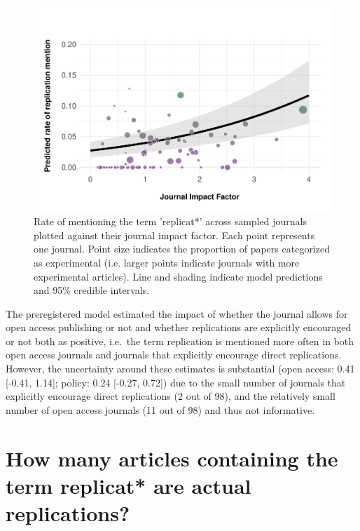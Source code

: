 \documentclass[]{elsarticle} %
\begin{document}
\begin{figure}

{\centering \includegraphics[width=1\linewidth]{ReplicationLing_files/figure-latex/plot-mention-jif-1} 

}

\caption{Rate of mentioning the term 'replicat*' across sampled journals plotted against their journal impact factor. Each point represents one journal. Point size indicates the proportion of papers categorized as experimental (i.e. larger points indicate journals with more experimental articles). Line and shading indicate model predictions and 95\% credible intervals.}\label{fig:plot-mention-jif}
\end{figure}

The preregistered model estimated the impact of whether the journal allows for open access publishing or not and whether replications are explicitly encouraged or not both as positive, i.e.~the term replication is mentioned more often in both open access journals and journals that explicitly encourage direct replications. However, the uncertainty around these estimates is substantial (open access: 0.41 {[}-0.41, 1.14{]}; policy: 0.24 {[}-0.27, 0.72{]}) due to the small number of journals that explicitly encourage direct replications (2 out of 98), and the relatively small number of open access journals (11 out of 98) and thus not informative.

\hypertarget{how-many-articles-containing-the-term-replicat-are-actual-replications}{%
\section{How many articles containing the term replicat* are actual replications?}\label{how-many-articles-containing-the-term-replicat-are-actual-replications}}
\end{document}
